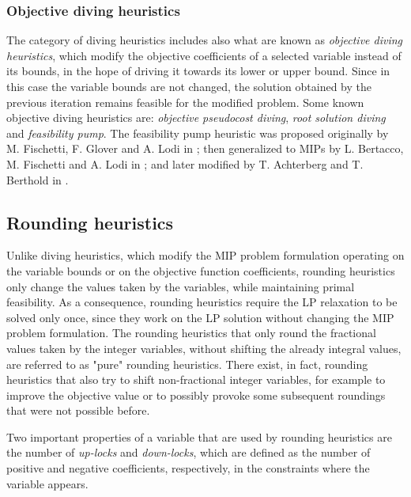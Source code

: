 \documentclass[a4paper,12pt,twoside]{scrbook}
\begin{document}
\subsubsection{Objective diving heuristics}
The category of diving heuristics includes also what are known as \textit{objective diving heuristics}, which modify the objective coefficients of a selected variable instead of its bounds, in the hope of driving it towards its lower or upper bound. Since in this case the variable bounds are not changed, the solution obtained by the previous iteration remains feasible for the modified problem. Some known objective diving heuristics are: \textit{objective pseudocost diving}, \textit{root solution diving} and \textit{feasibility pump}. The feasibility pump heuristic was proposed originally by M. Fischetti, F. Glover and A. Lodi in \cite{fischetti2005}; then generalized to MIPs by L. Bertacco, M. Fischetti and A. Lodi in \cite{bertacco2007}; and later modified by T. Achterberg and T. Berthold in \cite{achterberg2007}.

\subsection{Rounding heuristics} \label{sec:roundingheur}
Unlike diving heuristics, which modify the MIP problem formulation operating on the variable bounds or on the objective function coefficients, rounding heuristics only change the values taken by the variables, while maintaining primal feasibility. As a consequence, rounding heuristics require the LP relaxation to be solved only once, since they work on the LP solution without changing the MIP problem formulation. The rounding heuristics that only round the fractional values taken by the integer variables, without shifting the already integral values, are referred to as "pure" rounding heuristics. There exist, in fact, rounding heuristics that also try to shift non-fractional integer variables, for example to improve the objective value or to possibly provoke some subsequent roundings that were not possible before. \par
Two important properties of a variable that are used by rounding heuristics are the number of \textit{up-locks} and \textit{down-locks}, which are defined as the number of positive and negative coefficients, respectively, in the constraints where the variable appears. \par 

\end{document}
